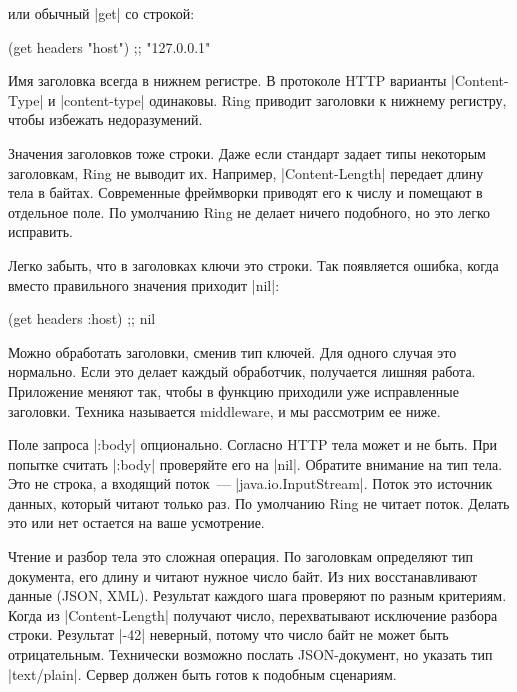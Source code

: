 \noindent
или обычный \spverb|get| со строкой:

\begin{english}
  \begin{clojure}
(get headers "host") ;; "127.0.0.1"
  \end{clojure}
\end{english}

Имя заголовка всегда в нижнем регистре. В протоколе HTTP варианты
\spverb|Content-Type| и \spverb|content-type| одинаковы. Ring приводит
заголовки к нижнему регистру, чтобы избежать недоразумений.

Значения заголовков тоже строки. Даже если стандарт задает типы некоторым
заголовкам, Ring не выводит их. Например, \spverb|Content-Length|
передает длину тела в байтах. Современные фреймворки приводят его к числу и
помещают в отдельное поле. По умолчанию Ring не делает ничего подобного, но это
легко исправить.

Легко забыть, что в заголовках ключи это строки. Так появляется ошибка, когда
вместо правильного значения приходит \spverb|nil|:

\begin{english}
  \begin{clojure}
(get headers :host) ;; nil
  \end{clojure}
\end{english}

Можно обработать заголовки, сменив тип ключей. Для одного случая это
нормально. Если это делает каждый обработчик, получается лишняя
работа. Приложение меняют так, чтобы в функцию приходили уже исправленные
заголовки. Техника называется middleware, и мы рассмотрим ее ниже.

Поле запроса \spverb|:body| опционально. Согласно HTTP тела может и не быть. При
попытке считать \spverb|:body| проверяйте его на \spverb|nil|. Обратите внимание
на тип тела. Это не строка, а входящий поток~---
\spverb|java.io.InputStream|. Поток это источник данных, который читают только
раз. По умолчанию Ring не читает поток. Делать это или нет остается на
ваше усмотрение.

Чтение и разбор тела это сложная операция. По заголовкам определяют тип
документа, его длину и читают нужное число байт. Из них восстанавливают данные
(JSON, XML). Результат каждого шага проверяют по разным критериям. Когда из
\spverb|Content-Length| получают число, перехватывают исключение разбора
строки. Результат \spverb|-42| неверный, потому что число байт не может быть
отрицательным. Технически возможно послать JSON-документ, но указать тип
\spverb|text/plain|. Сервер должен быть готов к подобным сценариям.

